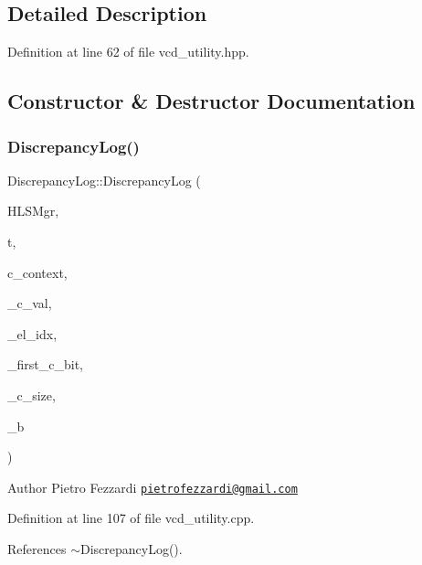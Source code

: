 \subsection{Detailed Description}


Definition at line 62 of file vcd\+\_\+utility.\+hpp.



\subsection{Constructor \& Destructor Documentation}
\mbox{\label{structDiscrepancyLog_a4aeef0545b10b424577486acd4f5cc4c}} 
\subsubsection{\texorpdfstring{Discrepancy\+Log()}{DiscrepancyLog()}}
{\footnotesize\ttfamily Discrepancy\+Log\+::\+Discrepancy\+Log (\begin{DoxyParamCaption}\item[{const \hyperlink{hls__manager_8hpp_a1b481383e3beabc89bd7562ae672dd8c}{H\+L\+S\+\_\+manager\+Const\+Ref}}]{H\+L\+S\+Mgr,  }\item[{const \hyperlink{structvcd__trace__head}{vcd\+\_\+trace\+\_\+head} \&}]{t,  }\item[{const uint64\+\_\+t}]{c\+\_\+context,  }\item[{std\+::string}]{\+\_\+c\+\_\+val,  }\item[{const unsigned int}]{\+\_\+el\+\_\+idx,  }\item[{const std\+::string\+::size\+\_\+type}]{\+\_\+first\+\_\+c\+\_\+bit,  }\item[{const std\+::string\+::size\+\_\+type}]{\+\_\+c\+\_\+size,  }\item[{const unsigned int}]{\+\_\+b }\end{DoxyParamCaption})}

\begin{DoxyAuthor}{Author}
Pietro Fezzardi \href{mailto:pietrofezzardi@gmail.com}{\tt pietrofezzardi@gmail.\+com} 
\end{DoxyAuthor}


Definition at line 107 of file vcd\+\_\+utility.\+cpp.



References $\sim$\+Discrepancy\+Log().

